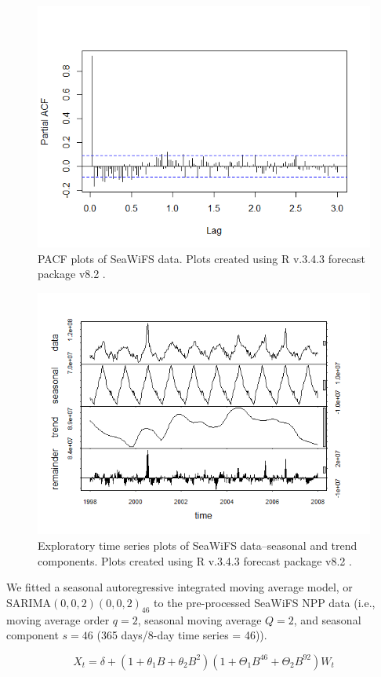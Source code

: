 \documentclass[oneside,12pt,final]{sty/ucthesis-CA2012}
\let\cite\citep                             %
\begin{document}
\begin{mainmatter}
\begin{figure}[H]
     \centering
       \includegraphics[width=.7\textwidth]{fig/seawifs_pacf}
    \caption{PACF plots of SeaWiFS data. Plots created using R v.3.4.3 \cite{Rcite} forecast package v8.2 \cite{forecast1, forecast2}.}
    \label{A2:SeaWiFSeda2}
\end{figure}

\begin{figure}[H]
     \centering
       \includegraphics[width=.7\textwidth]{fig/seawifs_periodic}
    \caption{Exploratory time series plots of SeaWiFS data--seasonal and trend components. Plots created using R v.3.4.3 \cite{Rcite} forecast package v8.2 \cite{forecast1, forecast2}.}
    \label{A2:SeaWiFSeda3}
\end{figure}

We fitted a seasonal autoregressive integrated moving average model, or \\ SARIMA$(0,0,2)(0,0,2)_{46}$ to the pre-processed SeaWiFS NPP data (i.e., moving average order $q = 2$, seasonal moving average $Q = 2$, and seasonal component $s = 46$ (365 days/8-day time series = 46)).

\begin{equation} \label{sarima}
X_t = \delta + (1 + \theta_1B + \theta_2B^2)(1 + \Theta_1B^{46} + \Theta_2B^{92})W_t
\end{equation}


\end{mainmatter}
\end{document}

